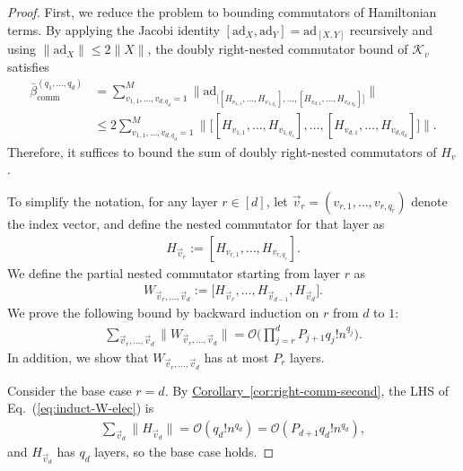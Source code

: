 \documentclass[11pt]{article}
\newcommand{\eq}[1]{(\ref{eq:#1})}
\newcommand{\cor}[1]{\hyperref[cor:#1]{Corollary~\ref*{cor:#1}}}
\newcommand{\ad}{\mathrm{ad}}
\renewcommand{\comm}{\mathrm{comm}}
\newcommand{\mc}{\mathcal}
\begin{document}
\begin{proof}
    First, we reduce the problem to bounding commutators of Hamiltonian terms. By applying the Jacobi identity $[\ad_{X}, \ad_Y] = \ad_{[X,Y]}$ recursively and using $\|\ad_X\| \le 2\|X\|$, the doubly right-nested commutator bound of $\mc K_v$ satisfies
    \begin{align*}
    \bar{\beta}_{\comm}^{(q_1, \ldots, q_{d})}
    &= \sum_{v_{1,1}, \ldots, v_{d, q_{d}} = 1}^M \bigg\| \ad_{\Big[ 
         [H_{v_{1,1}}, \ldots, H_{v_{1,q_1}}], \ldots, 
        [H_{v_{d,1}}, \ldots, H_{v_{d,q_{d}}}]
     \Big]} \bigg\|\\
     &\le 2\sum_{v_{1,1}, \ldots, v_{d, q_{d}} = 1}^M \bigg\|{\Big[ 
         [H_{v_{1,1}}, \ldots, H_{v_{1,q_1}}], \ldots, 
        [H_{v_{d,1}}, \ldots, H_{v_{d,q_{d}}}]
     \Big]} \bigg\|.
    \end{align*}
    Therefore, it suffices to bound the sum of doubly right-nested commutators of $H_v$. 
    
    To simplify the notation, for any layer $r \in [d]$, let $\vec{v}_r = (v_{r,1}, \ldots, v_{r, q_r})$ denote the index vector, and define the nested commutator for that layer as
    \begin{align*}
        H_{\vec{v}_r} := [H_{v_{r,1}}, \ldots, H_{v_{r, q_r}}].
    \end{align*}
    We define the partial nested commutator starting from layer $r$ as
    \begin{align*}
        W_{\vec{v}_{r}, \ldots, \vec{v}_d} := \Big[ H_{\vec{v}_r}, \ldots, H_{\vec{v}_{d-1}}, H_{\vec{v}_d} \Big].
    \end{align*}
    We prove the following bound by backward induction on $r$ from $d$ to $1$:
    \begin{align} \label{eq:induct-W-elec}
        \sum_{\vec{v}_{r}, \ldots, \vec{v}_{d}} \Big\|W_{\vec{v}_{r}, \ldots, \vec{v}_d}\Big\| = \mathcal{O}\bigg(\prod_{j=r}^{d}P_{j+1} q_j! n^{q_j}\bigg).
    \end{align} In addition, we show that $W_{\vec{v}_{r}, \ldots, \vec{v}_d}$ has at most $P_r$ layers.  
    
    Consider the base case $r=d$. By \cor{right-comm-second}, the LHS of Eq.~\eq{induct-W-elec} is \begin{align*}
        \sum_{\vec{v}_d} \|H_{\vec{v}_d}\| = \mc{O}(q_d ! n^{q_d}) = \mc{O}(P_{d+1}q_d ! n^{q_d}),
    \end{align*} and $H_{\vec{v}_d}$ has $q_d$ layers, so the base case holds. 


\end{proof}
\end{document}
